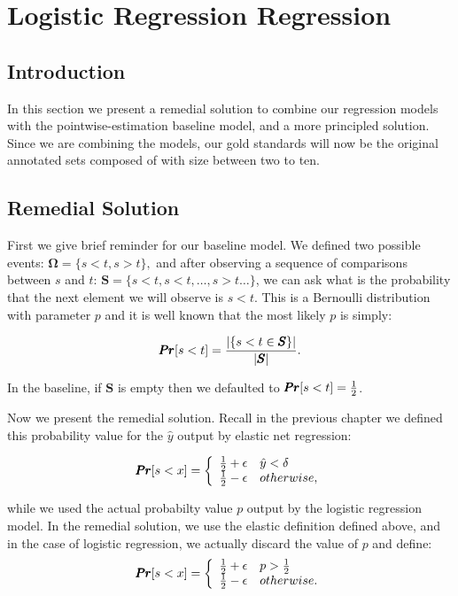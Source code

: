 \section{Logistic Regression Regression}

\subsection{Introduction}

In this section we present a remedial solution to combine our regression models with the pointwise-estimation baseline model, and a more principled solution. Since we are combining the models, our gold standards will now be the original annotated sets composed of with size between two to ten.

\subsection{Remedial Solution}

First we give brief reminder for our baseline model. We defined two possible events: $\pmb{\Omega} = \{s < t, s > t\},$ and after observing a sequence of comparisons between $s$ and $t$: $\pmb{S} = \{ s < t, s < t, \ldots, s > t \ldots \}$, we can ask what is the probability that the next element we will observe is $s < t$. This is a Bernoulli distribution with parameter $p$ and it is well known that the most likely $p$ is simply:

\begin{equation*}
	\pmb{Pr}[ s < t ] = \frac{|\{ s < t \in \pmb{S} \}|}{|\pmb{S}|}.
\end{equation*}

In the baseline, if $\pmb{S}$ is empty then we defaulted to $\pmb{Pr}[ s < t ] = \frac{1}{2}$. 

Now we present the remedial solution. Recall in the previous chapter we defined this probability value for the $\hat{y}$ output by elastic net regression:

\[   
\pmb{Pr}[s < x ] = \left\{
\begin{array}{ll}
      \frac{1}{2} + \epsilon & \hat{y} < \delta \\
      \frac{1}{2} - \epsilon & otherwise,
\end{array} 
\right.
\]

while we used the actual probabilty value $p$ output by the logistic regression model. In the remedial solution, we use the elastic definition defined above, and in the case of logistic regression, we actually discard the value of $p$ and define:
\[   
\pmb{Pr}[s < x ] = \left\{
\begin{array}{ll}
      \frac{1}{2} + \epsilon & p > \frac{1}{2} \\
      \frac{1}{2} - \epsilon & otherwise.
\end{array} 
\right.
\]

